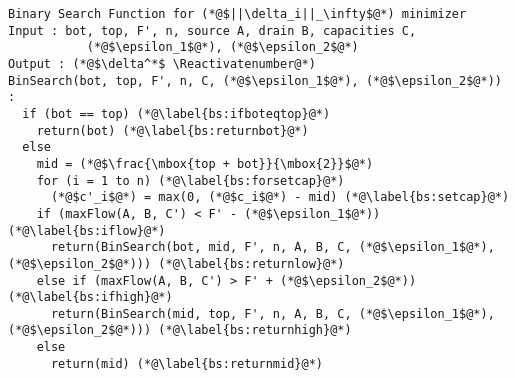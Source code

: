 \Suppressnumber
\begin{lstlisting}[label=binsearch, style=numbers]
Binary Search Function for (*@$||\delta_i||_\infty$@*) minimizer
Input : bot, top, F', n, source A, drain B, capacities C,
           (*@$\epsilon_1$@*), (*@$\epsilon_2$@*)
Output : (*@$\delta^*$ \Reactivatenumber@*)
BinSearch(bot, top, F', n, C, (*@$\epsilon_1$@*), (*@$\epsilon_2$@*)) :
  if (bot == top) (*@\label{bs:ifboteqtop}@*)
    return(bot) (*@\label{bs:returnbot}@*)
  else
    mid = (*@$\frac{\mbox{top + bot}}{\mbox{2}}$@*)
    for (i = 1 to n) (*@\label{bs:forsetcap}@*)
      (*@$c'_i$@*) = max(0, (*@$c_i$@*) - mid) (*@\label{bs:setcap}@*)
    if (maxFlow(A, B, C') < F' - (*@$\epsilon_1$@*)) (*@\label{bs:iflow}@*)
      return(BinSearch(bot, mid, F', n, A, B, C, (*@$\epsilon_1$@*), (*@$\epsilon_2$@*))) (*@\label{bs:returnlow}@*)
    else if (maxFlow(A, B, C') > F' + (*@$\epsilon_2$@*)) (*@\label{bs:ifhigh}@*)
      return(BinSearch(mid, top, F', n, A, B, C, (*@$\epsilon_1$@*), (*@$\epsilon_2$@*))) (*@\label{bs:returnhigh}@*)
    else
      return(mid) (*@\label{bs:returnmid}@*)
\end{lstlisting}

